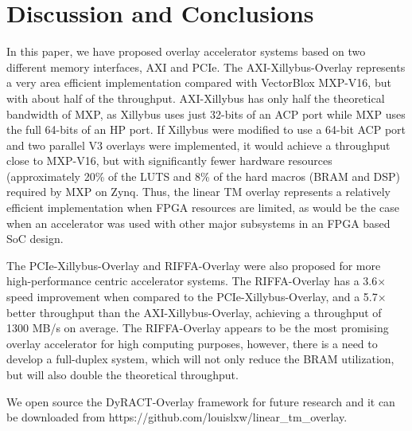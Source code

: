 \section{Discussion and Conclusions}
In this paper, we have proposed overlay accelerator systems based on two different memory interfaces, AXI and PCIe. 
The AXI-Xillybus-Overlay represents a very area efficient implementation compared with VectorBlox MXP-V16, but with about half of the throughput. 
AXI-Xillybus has only half the theoretical bandwidth of MXP, as Xillybus uses just 32-bits of an ACP port while MXP uses the full 64-bits of an HP port. 
If Xillybus were modified to use a 64-bit ACP port and two parallel V3 overlays were implemented, it would achieve a throughput close to MXP-V16, but with significantly fewer hardware resources (approximately 20\% of the LUTS and 8\% of the hard macros (BRAM and DSP) required by MXP on Zynq.
Thus, the linear TM overlay represents a relatively efficient implementation when FPGA resources are limited, as would be the case when an accelerator was used with other major subsystems in an FPGA based SoC design.

The PCIe-Xillybus-Overlay and RIFFA-Overlay were also proposed for more high-performance centric accelerator systems. 
The RIFFA-Overlay has a 3.6$\times$ speed improvement when compared to the PCIe-Xillybus-Overlay, and a 5.7$\times$ better throughput than the AXI-Xillybus-Overlay, achieving a throughput of 1300 MB/s on average. 
The RIFFA-Overlay appears to be the most promising overlay accelerator for high computing purposes, however, there is a need to develop a full-duplex system, which will not only reduce the BRAM utilization, but will also double the theoretical throughput.

We open source the DyRACT-Overlay framework for future research and it can be downloaded from https://github.com/louislxw/linear\_tm\_overlay. 